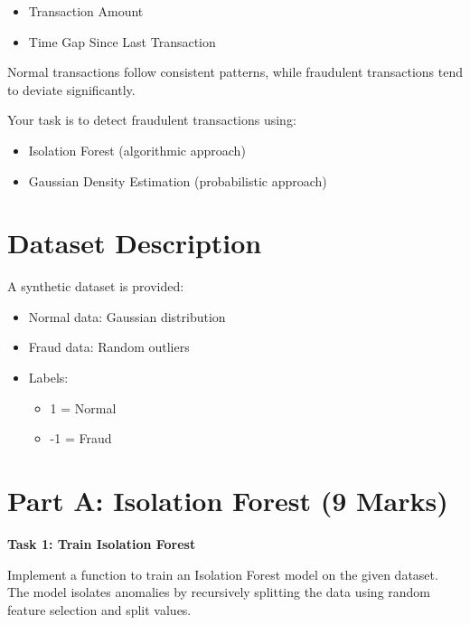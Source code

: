 \documentclass[12pt,a4paper]{article}
\begin{document}
\begin{itemize}
\item Transaction Amount
\item Time Gap Since Last Transaction
\end{itemize}

Normal transactions follow consistent patterns, while fraudulent transactions tend to deviate significantly.

Your task is to detect fraudulent transactions using:

\begin{itemize}
\item Isolation Forest (algorithmic approach)
\item Gaussian Density Estimation (probabilistic approach)
\end{itemize}


\section*{Dataset Description}

A synthetic dataset is provided:

\begin{itemize}
\item Normal data: Gaussian distribution
\item Fraud data: Random outliers
\item Labels:
    \begin{itemize}
    \item 1 = Normal
    \item -1 = Fraud
    \end{itemize}
\end{itemize}


\section*{Part A: Isolation Forest (9 Marks)}

\begin{tcolorbox}
\textbf{Task 1: Train Isolation Forest}

Implement a function to train an Isolation Forest model on the given dataset. 
The model isolates anomalies by recursively splitting the data using random 
feature selection and split values.

\vspace{2cm}

\vspace{2cm}
\end{tcolorbox}
\end{document}
